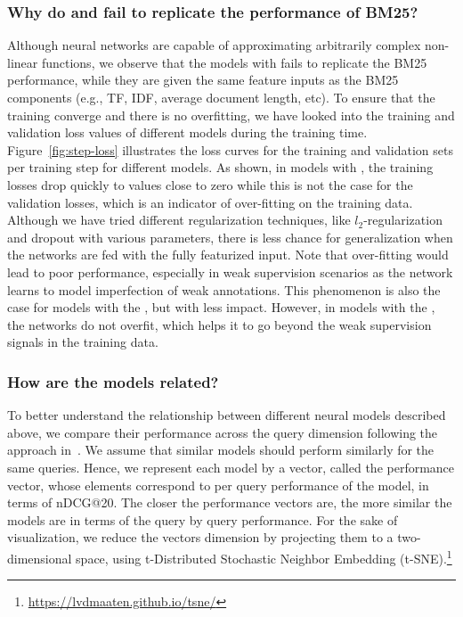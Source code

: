 \subsubsection{Why do \feedone and \feedtwo fail to replicate the performance of BM25?}
%
Although neural networks are capable of approximating arbitrarily complex non-linear functions, we observe that the models with \feedone fails to replicate the BM25 performance, while they are given the same feature inputs as the BM25 components (e.g., TF, IDF, average document length, etc). To ensure that the training converge and there is no overfitting, we have looked into the training and validation loss values of different models during the training time. Figure~\ref{fig:step-loss} illustrates the loss curves for the training and validation sets per training step for different models.
%
As shown, in models with \feedones, the training losses drop quickly to values close to zero while this is not the case for the validation losses, which is an indicator of over-fitting on the training data. 
Although we have tried different regularization techniques, like $l_2$-regularization and dropout with various parameters, there is less chance for generalization when the networks are fed with the fully featurized input. Note that over-fitting would lead to poor performance, especially in weak supervision scenarios as the network learns to model imperfection of weak annotations. 
%
This phenomenon is also the case for models with the \feedtwos, but with less impact. However, in models with the \feedthrees, the networks do not overfit, which helps it to go beyond the weak supervision signals in the training data.


\subsubsection{How are the models related?}
%
To better understand the relationship between different neural models described above, we compare their performance across the query dimension following the approach in~\citep{Mitra:2016}. 
We assume that similar models should perform similarly for the same queries. Hence, we represent each model by a vector, called the performance vector, whose elements correspond to per query performance of the model, in terms of nDCG@20. The closer the performance vectors are, the more similar the models are in terms of the query by query performance. For the sake of visualization, we reduce the vectors dimension by projecting them to a two-dimensional space, using t-Distributed Stochastic Neighbor Embedding (t-SNE).\footnote{\url{https://lvdmaaten.github.io/tsne/}}

